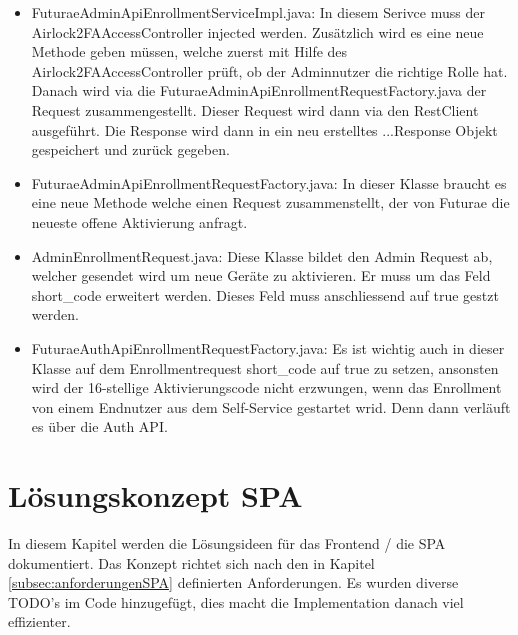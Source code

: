 \begin{itemize}
	\item FuturaeAdminApiEnrollmentServiceImpl.java: In diesem Serivce muss der\\ Airlock2FAAccessController injected werden. Zusätzlich wird es eine neue Methode geben müssen, welche zuerst mit Hilfe des Airlock2FAAccessController prüft, ob der Adminnutzer die richtige Rolle hat. Danach wird via die \flqq FuturaeAdminApiEnrollmentRequestFactory.java\frqq{} der Request zusammengestellt. Dieser Request wird dann via den RestClient ausgeführt. Die Response wird dann in ein neu erstelltes ...Response Objekt gespeichert und zurück gegeben.
	\item FuturaeAdminApiEnrollmentRequestFactory.java: In dieser Klasse braucht es eine neue Methode welche einen Request zusammenstellt, der von Futurae die neueste offene Aktivierung anfragt.
	\item AdminEnrollmentRequest.java: Diese Klasse bildet den Admin Request ab, welcher gesendet wird um neue Geräte zu aktivieren. Er muss um das Feld \flqq short\_code\frqq{} erweitert werden. Dieses Feld muss anschliessend auf true gestzt werden.
	\item FuturaeAuthApiEnrollmentRequestFactory.java: Es ist wichtig auch in dieser Klasse auf dem Enrollmentrequest \flqq short\_code\frqq{} auf true zu setzen, ansonsten wird der 16-stellige Aktivierungscode nicht erzwungen, wenn das Enrollment von einem Endnutzer aus dem Self-Service gestartet wrid. Denn dann verläuft es über die Auth API. 
\end{itemize}



\section{Lösungskonzept SPA}
In diesem Kapitel werden die Lösungsideen für das Frontend / die SPA dokumentiert.  Das Konzept richtet sich nach den in Kapitel \ref{subsec:anforderungenSPA} definierten Anforderungen. Es wurden diverse TODO's im Code hinzugefügt, dies macht die Implementation danach viel effizienter. 

